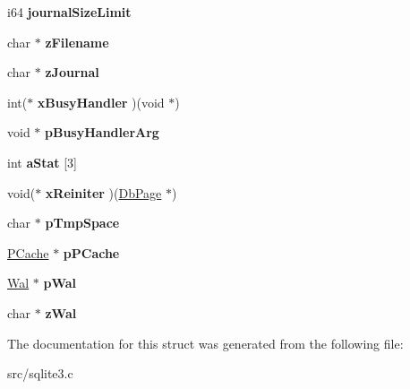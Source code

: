 \begin{DoxyCompactItemize}
\item 
\hypertarget{struct_pager_ae381db4e0b49f92596b0cdeb279e6bc6}{i64 {\bfseries journal\-Size\-Limit}}\label{struct_pager_ae381db4e0b49f92596b0cdeb279e6bc6}

\item 
\hypertarget{struct_pager_a2a55a044468f8658b7993e57087a5561}{char $\ast$ {\bfseries z\-Filename}}\label{struct_pager_a2a55a044468f8658b7993e57087a5561}

\item 
\hypertarget{struct_pager_ab36ce1f606c407ad3fc56a3651f5a319}{char $\ast$ {\bfseries z\-Journal}}\label{struct_pager_ab36ce1f606c407ad3fc56a3651f5a319}

\item 
\hypertarget{struct_pager_ac8477f7cc39fefd81b4089994e13d215}{int($\ast$ {\bfseries x\-Busy\-Handler} )(void $\ast$)}\label{struct_pager_ac8477f7cc39fefd81b4089994e13d215}

\item 
\hypertarget{struct_pager_a7a685e7a8dcbcd725c5a982fd8deb91b}{void $\ast$ {\bfseries p\-Busy\-Handler\-Arg}}\label{struct_pager_a7a685e7a8dcbcd725c5a982fd8deb91b}

\item 
\hypertarget{struct_pager_a0b3bb8afc7c4c82e0e99f3ad99dd0986}{int {\bfseries a\-Stat} \mbox{[}3\mbox{]}}\label{struct_pager_a0b3bb8afc7c4c82e0e99f3ad99dd0986}

\item 
\hypertarget{struct_pager_a632d3c81743a7f9104337ae3d45af04c}{void($\ast$ {\bfseries x\-Reiniter} )(\hyperlink{struct_pg_hdr}{Db\-Page} $\ast$)}\label{struct_pager_a632d3c81743a7f9104337ae3d45af04c}

\item 
\hypertarget{struct_pager_a64934188c72599e0be9ae54d3fc1cc92}{char $\ast$ {\bfseries p\-Tmp\-Space}}\label{struct_pager_a64934188c72599e0be9ae54d3fc1cc92}

\item 
\hypertarget{struct_pager_ae2495e45e354e92a858144386f91cab3}{\hyperlink{struct_p_cache}{P\-Cache} $\ast$ {\bfseries p\-P\-Cache}}\label{struct_pager_ae2495e45e354e92a858144386f91cab3}

\item 
\hypertarget{struct_pager_a2c759424108248d8b08e6f400fab14dd}{\hyperlink{struct_wal}{Wal} $\ast$ {\bfseries p\-Wal}}\label{struct_pager_a2c759424108248d8b08e6f400fab14dd}

\item 
\hypertarget{struct_pager_ac63ab281e48f9ac8521b85c1a90475b3}{char $\ast$ {\bfseries z\-Wal}}\label{struct_pager_ac63ab281e48f9ac8521b85c1a90475b3}

\end{DoxyCompactItemize}


The documentation for this struct was generated from the following file\-:\begin{DoxyCompactItemize}
\item 
src/sqlite3.\-c\end{DoxyCompactItemize}
